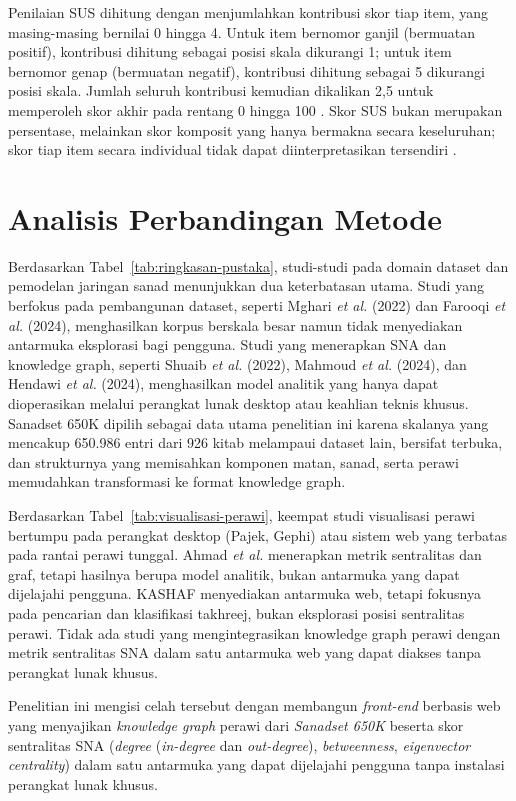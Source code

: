 \begin{sloppypar}
Penilaian SUS dihitung dengan menjumlahkan kontribusi skor tiap item, yang masing-masing bernilai 0 hingga 4. Untuk item bernomor ganjil (bermuatan positif), kontribusi dihitung sebagai posisi skala dikurangi 1; untuk item bernomor genap (bermuatan negatif), kontribusi dihitung sebagai 5 dikurangi posisi skala. Jumlah seluruh kontribusi kemudian dikalikan 2,5 untuk memperoleh skor akhir pada rentang 0 hingga 100 \cite{Brooke1996}. Skor SUS bukan merupakan persentase, melainkan skor komposit yang hanya bermakna secara keseluruhan; skor tiap item secara individual tidak dapat diinterpretasikan tersendiri \cite{Brooke1996}.
\end{sloppypar}

\section{Analisis Perbandingan Metode}

Berdasarkan Tabel~\ref{tab:ringkasan-pustaka}, studi-studi pada domain dataset dan pemodelan jaringan sanad menunjukkan dua keterbatasan utama. Studi yang berfokus pada pembangunan dataset, seperti Mghari \textit{et al.} (2022) dan Farooqi \textit{et al.} (2024), menghasilkan korpus berskala besar namun tidak menyediakan antarmuka eksplorasi bagi pengguna. Studi yang menerapkan SNA dan knowledge graph, seperti Shuaib \textit{et al.} (2022), Mahmoud \textit{et al.} (2024), dan Hendawi \textit{et al.} (2024), menghasilkan model analitik yang hanya dapat dioperasikan melalui perangkat lunak desktop atau keahlian teknis khusus. Sanadset 650K \cite{MGHARI2022108540} dipilih sebagai data utama penelitian ini karena skalanya yang mencakup 650.986 entri dari 926 kitab melampaui dataset lain, bersifat terbuka, dan strukturnya yang memisahkan komponen matan, sanad, serta perawi memudahkan transformasi ke format knowledge graph.

Berdasarkan Tabel~\ref{tab:visualisasi-perawi}, keempat studi visualisasi perawi bertumpu pada perangkat desktop (Pajek, Gephi) atau sistem web yang terbatas pada rantai perawi tunggal. Ahmad \textit{et al.} \cite{ahmad2025hadith} menerapkan metrik sentralitas dan graf, tetapi hasilnya berupa model analitik, bukan antarmuka yang dapat dijelajahi pengguna. KASHAF \cite{shafie2021kashaf} menyediakan antarmuka web, tetapi fokusnya pada pencarian dan klasifikasi takhreej, bukan eksplorasi posisi sentralitas perawi. Tidak ada studi yang mengintegrasikan knowledge graph perawi dengan metrik sentralitas SNA dalam satu antarmuka web yang dapat diakses tanpa perangkat lunak khusus.

Penelitian ini mengisi celah tersebut dengan membangun \textit{front-end} berbasis web yang menyajikan \textit{knowledge graph} perawi dari \textit{Sanadset 650K} beserta skor sentralitas SNA (\textit{degree} (\textit{in-degree} dan \textit{out-degree}), \textit{betweenness}, \textit{eigenvector centrality}) dalam satu antarmuka yang dapat dijelajahi pengguna tanpa instalasi perangkat lunak khusus.

